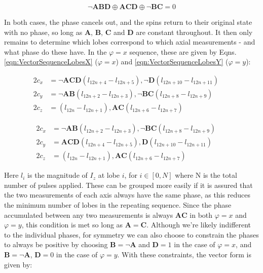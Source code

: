 \documentclass[PaulGanssle-Thesis.tex]{subfiles}
\begin{document}
\begin{equation}
\label{eqn:VectorSequencePhaseAccumulationY}
\neg\mathbf{ABD}\oplus\mathbf{ACD}\oplus\neg\mathbf{BC} = 0
\end{equation}

In both cases, the phase cancels out, and the spins return to their original state with no phase, so long as $\mathbf{A}$, $\mathbf{B}$, $\mathbf{C}$ and $\mathbf{D}$ are constant throughout. It then only remains to determine which lobes correspond to which axial measurements - and what phase do these have. In the $\varphi = x$ sequence, these are given by Eqns. \ref{eqn:VectorSequenceLobesX} ($\varphi = x$) and \ref{eqn:VectorSequenceLobesY} ($\varphi = y$): 

\begin{equation}
\label{eqn:VectorSequenceLobesX}
\begin{aligned}
 2c_{x} & = \neg\mathbf{ACD}\left(l_{12n+4}-l_{12n+5}\right), \neg\mathbf{D}\left(l_{12n+10}-l_{12n+11}\right) && \\
 2c_{y} & = \neg\mathbf{AB}\left(l_{12n+2}-l_{12n+3}\right), \neg\mathbf{BC}\left(l_{12n+8}-l_{12n+9}\right) && \\
 2c_{z} & = \left(l_{12n}-l_{12n+1}\right), \mathbf{AC}\left(l_{12n+6}-l_{12n+7}\right) && 
\end{aligned}
\end{equation}

\begin{equation}
\label{eqn:VectorSequenceLobesY}
\begin{aligned}
 2c_{x} & = \neg\mathbf{AB}\left(l_{12n+2}-l_{12n+3}\right), \neg\mathbf{BC}\left(l_{12n+8}-l_{12n+9}\right) && \\
 2c_{y} & = \mathbf{ACD}\left(l_{12n+4}-l_{12n+5}\right), \mathbf{D}\left(l_{12n+10}-l_{12n+11}\right) && \\
 2c_{z} & = \left(l_{12n}-l_{12n+1}\right), \mathbf{AC}\left(l_{12n+6}-l_{12n+7}\right) && 
\end{aligned}
\end{equation}


Here $l_i$ is the magnitude of $I_{z}$ at lobe $i$, for $i \in [0, N]$ where N is the total number of pulses applied. These can be grouped more easily if it is assured that the two measurements of each axis always have the same phase, as this reduces the minimum number of lobes in the repeating sequence. Since the phase accumulated between any two measurements is always $\mathbf{AC}$ in both $\varphi = x$ and $\varphi = y$, this condition is met so long as $\mathbf{A} = \mathbf{C}$. Although we're likely indifferent to the individual phases, for symmetry we can also choose to constrain the phases to always be positive by choosing $\mathbf{B} = \neg\mathbf{A}$ and $\mathbf{D} = 1$ in the case of $\varphi = x$, and $\mathbf{B} = \neg\mathbf{A}$, $\mathbf{D} = 0$ in the case of $\varphi = y$. With these constraints, the vector form is given by:
\end{document}
